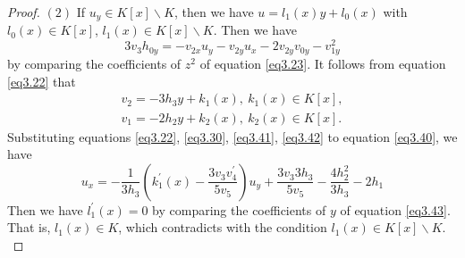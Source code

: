 \documentclass[12pt, twoside, leqno]{article}
\theoremstyle{definition}
\numberwithin{equation}{section}
\begin{document}
\begin{proof}
$(2)$ If $u_y\in K[x]\backslash K$, then we have $u=l_1(x)y+l_0(x)$ with $l_0(x)\in K[x]$, $l_1(x)\in K[x]\backslash K$. Then we have
\begin{equation}\label{eq3.40}
3v_{3}h_{0y}=-v_{2x}u_{y}-v_{2y}u_{x}-2v_{2y}v_{0y}-v_{1y}^2
\end{equation}
by comparing the coefficients of $z^2$ of equation \eqref{eq3.23}. It follows from equation \eqref{eq3.22} that
\begin{eqnarray}
v_2=-3h_3y+k_1(x),~k_1(x)\in K[x],\label{eq3.41}\\
v_1=-2h_2y+k_2(x),~k_2(x)\in K[x].\label{eq3.42}
\end{eqnarray}
Substituting equations \eqref{eq3.22}, \eqref{eq3.30}, \eqref{eq3.41}, \eqref{eq3.42} to equation \eqref{eq3.40}, we have
\begin{equation}\label{eq3.43}
u_{x}=-\frac{1}{3h_{3}}\left( k_{1}^{'}(x)-\frac{3v_{3}v_{4}^{'}}{5v_{5}}\right) u_{y}+\frac{3v_{3}3h_{3}}{5v_{5}}-\frac{4h_2^2}{3h_{3}}-2h_{1}
\end{equation}
Then we have $l_{1}^{'}(x)=0$ by comparing the coefficients of $y$ of equation \eqref{eq3.43}. That is, $l_1(x)\in K$, which contradicts with the condition $l_1(x)\in K[x]\backslash K$.\\


\end{proof}
\end{document}
